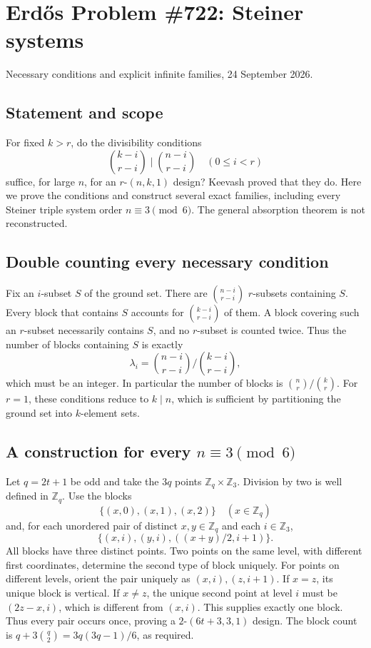 \section{Erd\H{o}s Problem \#722: Steiner systems}
\noindent Necessary conditions and explicit infinite families, 24 September 2026.

\subsection*{Statement and scope}
For fixed $k>r$, do the divisibility conditions
\[
 \binom{k-i}{r-i}\mid\binom{n-i}{r-i}\quad(0\leq i<r)
\]
suffice, for large $n$, for an $r$-$(n,k,1)$ design? Keevash proved that they do. Here we prove the conditions and construct several exact families, including every Steiner triple system order $n\equiv3\pmod6$. The general absorption theorem is not reconstructed.

\subsection*{Double counting every necessary condition}
Fix an $i$-subset $S$ of the ground set. There are $\binom{n-i}{r-i}$ $r$-subsets containing $S$. Every block that contains $S$ accounts for $\binom{k-i}{r-i}$ of them. A block covering such an $r$-subset necessarily contains $S$, and no $r$-subset is counted twice. Thus the number of blocks containing $S$ is exactly
\[
 \lambda_i=\binom{n-i}{r-i}\big/\binom{k-i}{r-i},
\]
which must be an integer. In particular the number of blocks is $\binom nr/\binom kr$.
For $r=1$, these conditions reduce to $k\mid n$, which is sufficient by partitioning the ground set into $k$-element sets.

\subsection*{A construction for every $n\equiv3\pmod6$}
Let $q=2t+1$ be odd and take the $3q$ points $\mathbb Z_q\times\mathbb Z_3$. Division by two is well defined in $\mathbb Z_q$. Use the blocks
\[
 \{(x,0),(x,1),(x,2)\}\quad(x\in\mathbb Z_q)
\]
and, for each unordered pair of distinct $x,y\in\mathbb Z_q$ and each $i\in\mathbb Z_3$,
\[
 \{(x,i),(y,i),((x+y)/2,i+1)\}.
\]
All blocks have three distinct points.
Two points on the same level, with different first coordinates, determine the second type of block uniquely. For points on different levels, orient the pair uniquely as $(x,i),(z,i+1)$. If $x=z$, its unique block is vertical. If $x\ne z$, the unique second point at level $i$ must be $(2z-x,i)$, which is different from $(x,i)$. This supplies exactly one block. Thus every pair occurs once, proving a $2$-$(6t+3,3,1)$ design. The block count is
$q+3\binom q2=3q(3q-1)/6$, as required.

